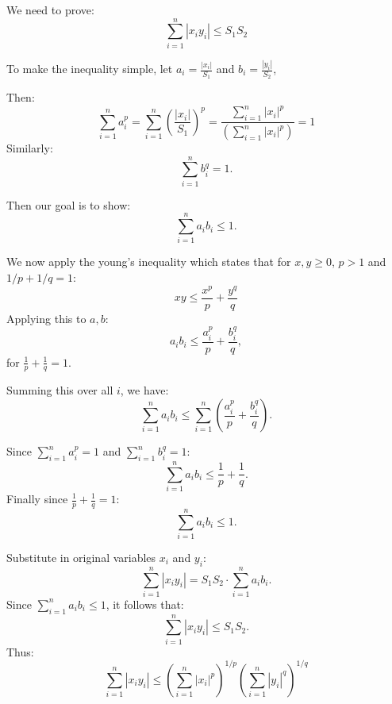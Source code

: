\documentclass[12pt]{article}
\begin{document}
We need to prove:
\[
\sum_{i=1}^n |x_iy_i| \le S_1S_2
\]

To make the inequality simple, let \( a_i = \frac{|x_i|}{S_1} \) and \( b_i = \frac{|y_i|}{S_2} \), 

Then:
\[
\sum_{i=1}^n a_i^p = \sum_{i=1}^n \left(\frac{|x_i|}{S_1}\right)^p = \frac{\sum_{i=1}^n |x_i|^p}{\left(\sum_{i=1}^n |x_i|^p \right)}  =  1
\]
Similarly:
\[
\sum_{i=1}^n b_i^q = 1.
\]

Then our goal is to show:
\[
\sum_{i=1}^n a_i b_i \leq 1.
\]

We now apply the young's inequality which states that for $x,y \ge 0$, $p > 1$ and $1/p + 1/q = 1$:
\[
xy\le \frac{x^p}{p} +  \frac{y^q}{q}
\]
Applying this to $a, b$:
\[
a_i b_i \leq \frac{a_i^p}{p} + \frac{b_i^q}{q},
\]
for \( \frac{1}{p} + \frac{1}{q} = 1 \).

Summing this over all \( i \), we have:
\[
\sum_{i=1}^n a_i b_i \leq \sum_{i=1}^n \left( \frac{a_i^p}{p} + \frac{b_i^q}{q} \right).
\]

Since \( \sum_{i=1}^n a_i^p = 1 \) and \( \sum_{i=1}^n b_i^q = 1 \):
\[
\sum_{i=1}^n a_i b_i \leq \frac{1}{p} + \frac{1}{q}.
\]
Finally since \( \frac{1}{p} + \frac{1}{q} = 1 \):
\[
\sum_{i=1}^n a_i b_i \leq 1.
\]

Substitute in original variables \( x_i \) and \( y_i \):
\[
\sum_{i=1}^n |x_i y_i| = S_1 S_2 \cdot \sum_{i=1}^n a_i b_i.
\]
Since \( \sum_{i=1}^n a_i b_i \leq 1 \), it follows that:
\[
\sum_{i=1}^n |x_i y_i| \leq S_1 S_2.
\]
Thus:
\[
\sum_{i=1}^n |x_iy_i| \le \left(\sum_{i=1}^n |x_i|^p \right)^{1/p} \left(\sum_{i=1}^n |y_i|^q \right)^{1/q}
\]
\end{document}
